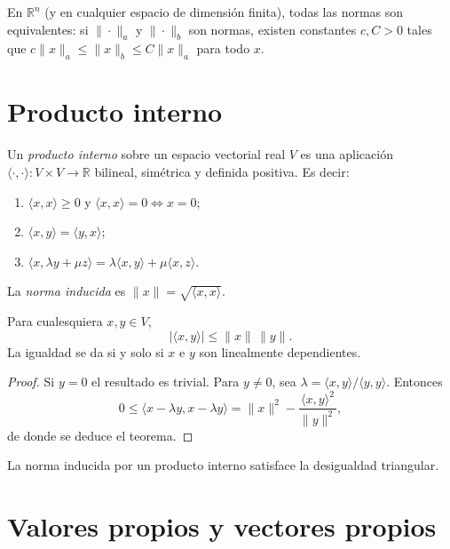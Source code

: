 \begin{theorem}
\label{teo:equivalencia-normas-ap}
En $\mathbb{R}^n$ (y en cualquier espacio de dimensión finita), todas las normas son equivalentes: si $\|\cdot\|_a$ y $\|\cdot\|_b$ son normas, existen constantes $c,C>0$ tales que $c\|x\|_a\leq\|x\|_b\leq C\|x\|_a$ para todo $x$.
\end{theorem}

\section{Producto interno}

\begin{definition}
\label{def:producto-interno-ap}
Un \emph{producto interno} sobre un espacio vectorial real $V$ es una aplicación $\langle\cdot,\cdot\rangle\colon V\times V\to\mathbb{R}$ bilineal, simétrica y definida positiva. Es decir:
\begin{enumerate}
  \item[(i)] $\langle x,x\rangle\geq 0$ y $\langle x,x\rangle=0\Leftrightarrow x=0$;
  \item[(ii)] $\langle x,y\rangle=\langle y,x\rangle$;
  \item[(iii)] $\langle x,\lambda y+\mu z\rangle=\lambda\langle x,y\rangle+\mu\langle x,z\rangle$.
\end{enumerate}
La \emph{norma inducida} es $\|x\|=\sqrt{\langle x,x\rangle}$.
\end{definition}

\begin{theorem}
\label{teo:cauchy-schwarz-ap}
Para cualesquiera $x,y\in V$,
\[
  |\langle x,y\rangle|\leq\|x\|\,\|y\|.
\]
La igualdad se da si y solo si $x$ e $y$ son linealmente dependientes.
\end{theorem}
\begin{proof}
Si $y=0$ el resultado es trivial. Para $y\neq 0$, sea $\lambda=\langle x,y\rangle/\langle y,y\rangle$. Entonces
\[
  0\leq\langle x-\lambda y,x-\lambda y\rangle=\|x\|^2-\frac{\langle x,y\rangle^2}{\|y\|^2},
\]
de donde se deduce el teorema.
\end{proof}

\begin{corollary}
La norma inducida por un producto interno satisface la desigualdad triangular.
\end{corollary}

\section{Valores propios y vectores propios}

